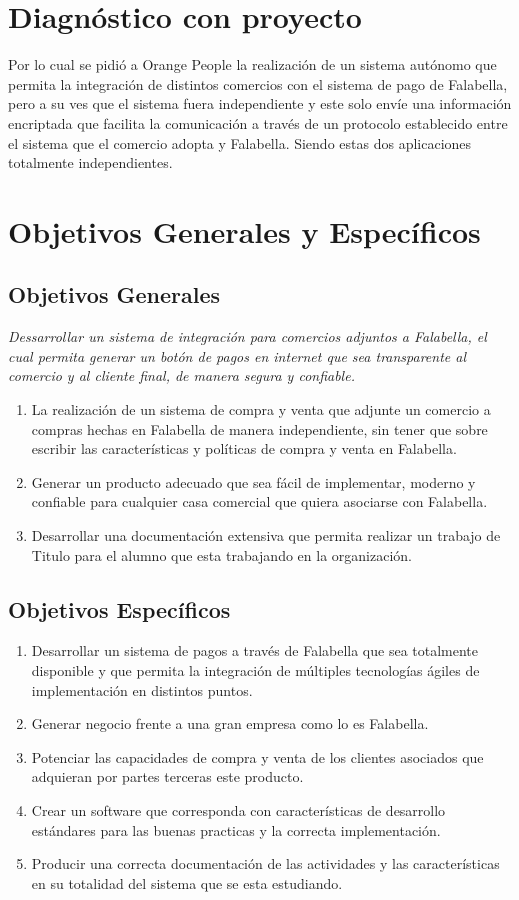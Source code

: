 \documentclass[a4paper,12pt,openany,oneside]{book}
\begin{document}
\section{Diagnóstico con proyecto}
Por lo cual se pidió a Orange People la realización de un sistema autónomo que permita la integración de distintos comercios con el sistema de pago de Falabella, pero a su ves que el sistema fuera independiente y este solo envíe una información encriptada que facilita la comunicación a través de un protocolo establecido entre el sistema que el comercio adopta y Falabella. Siendo estas dos aplicaciones totalmente independientes.
\section{Objetivos Generales y Específicos}
\subsection{Objetivos Generales}
\textit{Dessarrollar un sistema de integración para comercios adjuntos a Falabella, el cual permita generar un botón de pagos en internet que sea transparente al comercio y al cliente final, de manera segura y confiable.}
\begin{enumerate}
\item La realización de un sistema de compra y venta que adjunte un comercio a compras hechas en Falabella de manera independiente, sin tener que sobre escribir las características y políticas de compra y venta en Falabella.
\item Generar un producto adecuado que sea fácil de implementar, moderno y confiable para cualquier casa comercial que quiera asociarse con Falabella.
\item Desarrollar una documentación extensiva que permita realizar un trabajo de Titulo para el alumno que esta trabajando en la organización.
\end{enumerate}
\subsection{Objetivos Específicos}
\begin{enumerate}
\item Desarrollar un sistema de pagos a través de Falabella que sea totalmente disponible y que permita la integración de múltiples tecnologías ágiles de implementación en distintos puntos.
\item Generar negocio frente a una gran empresa como lo es Falabella.
\item Potenciar las capacidades de compra y venta de los clientes asociados que adquieran por partes terceras este producto.
\item Crear un software que corresponda con características de desarrollo estándares para las buenas practicas y la correcta implementación.
\item Producir una correcta documentación de las actividades y las características en su totalidad del sistema que se esta estudiando.
\end{enumerate}
\end{document}
